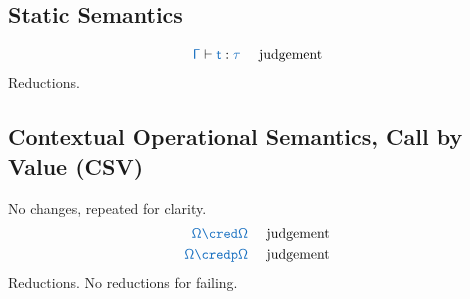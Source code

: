 \documentclass{article}
\begin{document}
\subsection{Static Semantics}
\begin{align*}
	\src{\Gamma}\vdash\src{t}:\src{\tau} 
	&&
	\text{ judgement }
\end{align*}
Reductions.
\begin{center}
\end{center}

\subsection{Contextual Operational Semantics, Call by Value (CSV)}
No changes, repeated for clarity.
\begin{align*}
	\src{\Omega\cred\Omega} 
	&&
	\text{ judgement }
	\\
	\src{\Omega\credp\Omega} 
	&&
	\text{ judgement }
\end{align*}
Reductions.
No reductions for failing.
\begin{center}
\end{center}
\end{document}
